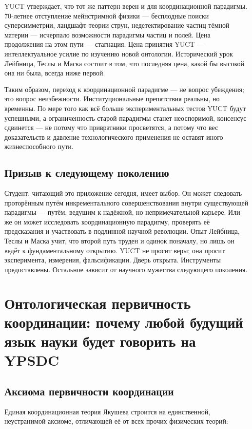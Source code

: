 \documentclass[12pt,a4paper]{article}
\begin{document}
	YUCT утверждает, что тот же паттерн верен и для координационной парадигмы. 70‑летнее отступление мейнстримной физики — бесплодные поиски суперсимметрии, ландшафт теории струн, недетектирование частиц тёмной материи — исчерпало возможности парадигмы частиц и полей. Цена продолжения на этом пути — стагнация. Цена принятия YUCT — интеллектуальное усилие по изучению новой онтологии. Исторический урок Лейбница, Теслы и Маска состоит в том, что последняя цена, какой бы высокой она ни была, всегда ниже первой.
	
	Таким образом, переход к координационной парадигме — не вопрос убеждения; это вопрос неизбежности. Институциональные препятствия реальны, но временны. По мере того как всё больше экспериментальных тестов YUCT будут успешными, а ограниченность старой парадигмы станет неоспоримой, консенсус сдвинется — не потому что привратники просветятся, а потому что вес доказательств и давление технологического применения не оставят иного жизнеспособного пути.
	
	\subsection{Призыв к следующему поколению}
	
	Студент, читающий это приложение сегодня, имеет выбор. Он может следовать проторённым путём инкрементального совершенствования внутри существующей парадигмы — путём, ведущим к надёжной, но непримечательной карьере. Или же он может исследовать координационную парадигму, проверять её предсказания и участвовать в подлинной научной революции. Опыт Лейбница, Теслы и Маска учит, что второй путь труден и одинок поначалу, но лишь он ведёт к фундаментальному открытию. YUCT не просит веры; она просит эксперимента, измерения, фальсификации. Дверь открыта. Инструменты предоставлены. Остальное зависит от научного мужества следующего поколения.
	
	\section{Онтологическая первичность координации: почему любой будущий язык науки будет говорить на YPSDC}
	
	\subsection{Аксиома первичности координации}
	
	Единая координационная теория Якушева строится на единственной, неустранимой аксиоме, отличающей её от всех прочих физических теорий:
	
\end{document}
